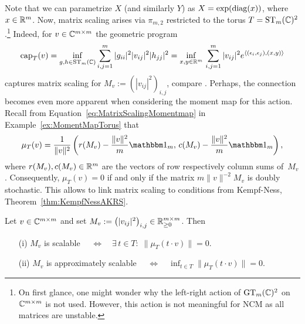 Note that we can parametrize $X$ (and similarly $Y$) as $X = \exp(\operatorname{diag}(x))$, where $x \in \mathbb R^m$. Now, matrix scaling arises via $\pi_{m,2}$ restricted to the torus $T = \operatorname{ST}_m(\mathbb C)^2$.\footnote{On first glance, one might wonder why the left-right action of $\operatorname{GT}_m(\mathbb C)^2$ on $\mathbb C^{m \times m}$ is not used. However, this action is not meaningful for NCM as all matrices are unstable.}
Indeed, for $v \in \mathbb C^{m \times m}$ the geometric program
	\begin{equation}\label{eq:MatrixScalingCapacity}
		\operatorname{cap}_T(v) = \inf_{g,h \in \operatorname{ST}_m(\mathbb C)} \sum_{i,j=1}^m | g_{ii}|^2 |v_{ij}|^2 |h_{jj}|^2
		= \inf_{x,y \in \mathbb R^m} \, \sum_{i,j=1}^m |v_{ij}|^2 e^{\langle (\epsilon_i, \epsilon_j), (x,y) \rangle}
	\end{equation}
captures matrix scaling for $M_v := ( |v_{ij}|^2 )_{i,j}$, compare \cite[Programs~I and~II]{rothblum1989scalings}.
Perhaps, the connection becomes even more apparent when considering the moment map for this action.
Recall from Equation~\eqref{eq:MatrixScalingMomentmap} in Example~\ref{ex:MomentMapTorus} that
	\begin{equation}
		\mu_T(v) = \frac{1}{\|v\|^2} \left( r(M_v) - \frac{\|v\|^2}{m} \ones_m, \, c(M_v) - \frac{\|v\|^2}{m} \ones_m \right),
	\end{equation}
where $r(M_v), c(M_v) \in \mathbb R^m$ are the vectors of row respectively column sums of~$M_v$.
Consequently, $\mu_T(v) = 0$ if and only if the matrix $m \|v\|^{-2} M_v$ is doubly stochastic. 
This allows to link matrix scaling to conditions from Kempf-Ness, Theorem~\ref{thm:KempfNessAKRS}.

\begin{prop} \label{prop:MatrixScalingMomentMap}
	Let $v \in \mathbb C^{m \times m}$ and set $M_v := \big( |v_{ij}|^2 \big)_{i,j} \in \mathbb R_{\geq 0}^{m \times m}$. Then
	\begin{itemize}
		\item[(i)] $M_v$ is scalable $\quad \Leftrightarrow \quad \exists \, t \in T \colon \; \|\mu_T(t \cdot v)\| = 0$.
		
		\item[(ii)] $M_v$ is approximately scalable $\quad \Leftrightarrow \quad \inf_{t \in T} \|\mu_T(t \cdot v)\| = 0$.
	\end{itemize}
\end{prop}

